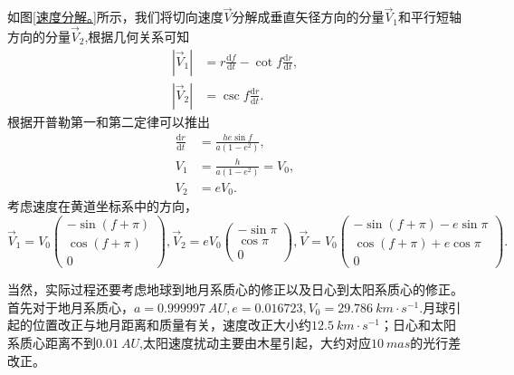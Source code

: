 \documentclass[11pt, a4paper, oneside]{ctexart}
\numberwithin{equation}{subsection}
\begin{document}
如图\ref{速度分解。}所示，我们将切向速度$\vec{V}$分解成垂直矢径方向的分量$\vec{V}_{1}$和平行短轴方向的分量$\vec{V}_{2}$,根据几何关系可知
\begin{align}
\left\vert{}\vec{V}_{1}\right\vert{}&=r\frac{\mathrm{d}f}{\mathrm{d}t}-\cot f\frac{\mathrm{d}r}{\mathrm{d}t},\\
\left\vert{}\vec{V}_{2}\right\vert{}&=\csc f\frac{\mathrm{d}r}{\mathrm{d}t}.
\end{align}
根据开普勒第一和第二定律可以推出
\begin{align}
\frac{\mathrm{d}r}{\mathrm{d}t}&=\frac{he\sin f}{a\left(1-e^2\right)},\\
V_1&=\frac{h}{a\left(1-e^2\right)}=V_0,\\
V_2&=eV_0.
\end{align}
考虑速度在黄道坐标系中的方向，
\begin{equation}
\vec V_1=V_0\begin{pmatrix}
-\sin\left(f+\pi\right)\\
\cos\left(f+\pi\right)\\
0
\end{pmatrix},
\vec V_2=eV_0\begin{pmatrix}
-\sin\pi\\
\cos\pi\\
0
\end{pmatrix},
\vec V=V_0\begin{pmatrix}
-\sin\left(f+\pi\right)-e\sin\pi\\
\cos\left(f+\pi\right)+e\cos\pi\\
0
\end{pmatrix}.
\end{equation}

当然，实际过程还要考虑地球到地月系质心的修正以及日心到太阳系质心的修正。首先对于地月系质心，$a=\qty{0.999997}{AU},e=0.016723,V_{0}=\qty{29.786}{km\cdot{}s^{-1}}$.月球引起的位置改正与地月距离和质量有关，速度改正大小约$\qty{12.5}{km\cdot{}s^{-1}}$；日心和太阳系质心距离不到$\qty{0.01}{AU}$,太阳速度扰动主要由木星引起，大约对应$\qty{10}{mas}$的光行差改正。
\end{document}
